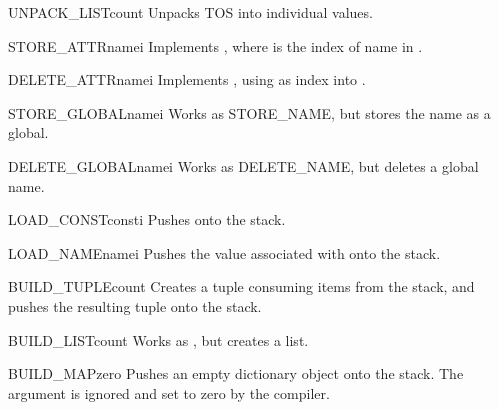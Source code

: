 \begin{funcdesc}{UNPACK_LIST}{count}
Unpacks TOS into  individual values.
\end{funcdesc}


\begin{funcdesc}{STORE_ATTR}{namei}
Implements , where  is the index
of name in .
\end{funcdesc}

\begin{funcdesc}{DELETE_ATTR}{namei}
Implements , using  as index into
.
\end{funcdesc}

\begin{funcdesc}{STORE_GLOBAL}{namei}
Works as STORE_NAME, but stores the name as a global.
\end{funcdesc}

\begin{funcdesc}{DELETE_GLOBAL}{namei}
Works as DELETE_NAME, but deletes a global name.
\end{funcdesc}


\begin{funcdesc}{LOAD_CONST}{consti}
Pushes  onto the stack.
\end{funcdesc}

\begin{funcdesc}{LOAD_NAME}{namei}
Pushes the value associated with  onto the stack.
\end{funcdesc}

\begin{funcdesc}{BUILD_TUPLE}{count}
Creates a tuple consuming  items from the stack, and pushes
the resulting tuple onto the stack.
\end{funcdesc}

\begin{funcdesc}{BUILD_LIST}{count}
Works as , but creates a list.
\end{funcdesc}

\begin{funcdesc}{BUILD_MAP}{zero}
Pushes an empty dictionary object onto the stack.  The argument is ignored
and set to zero by the compiler.
\end{funcdesc}

